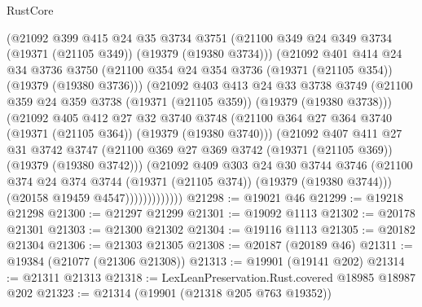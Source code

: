 \begin{lexlean}{RustCore}
\begin{coremodule}
                (@21092
                  @399
                  @415
                  @24
                  @35
                  @3734
                  @3751
                  (@21100 @349 @24 @349 @3734 (@19371 (@21105 @349)) (@19379 (@19380 @3734)))
                  (@21092
                    @401
                    @414
                    @24
                    @34
                    @3736
                    @3750
                    (@21100 @354 @24 @354 @3736 (@19371 (@21105 @354)) (@19379 (@19380 @3736)))
                    (@21092
                      @403
                      @413
                      @24
                      @33
                      @3738
                      @3749
                      (@21100 @359 @24 @359 @3738 (@19371 (@21105 @359)) (@19379 (@19380 @3738)))
                      (@21092
                        @405
                        @412
                        @27
                        @32
                        @3740
                        @3748
                        (@21100 @364 @27 @364 @3740 (@19371 (@21105 @364)) (@19379 (@19380 @3740)))
                        (@21092
                          @407
                          @411
                          @27
                          @31
                          @3742
                          @3747
                          (@21100
                            @369
                            @27
                            @369
                            @3742
                            (@19371 (@21105 @369))
                            (@19379 (@19380 @3742)))
                          (@21092
                            @409
                            @303
                            @24
                            @30
                            @3744
                            @3746
                            (@21100
                              @374
                              @24
                              @374
                              @3744
                              (@19371 (@21105 @374))
                              (@19379 (@19380 @3744)))
                            (@20158 @19459 @4547)))))))))))))
@21298 := @19021 @46
@21299 := @19218 @21298
@21300 := @21297 @21299
@21301 := @19092 @1113
@21302 := @20178 @21301
@21303 := @21300 @21302
@21304 := @19116 @1113
@21305 := @20182 @21304
@21306 := @21303 @21305
@21308 := @20187 (@20189 @46)
@21311 := @19384 (@21077 (@21306 @21308))
@21313 := @19901 (@19141 @202)
@21314 := @21311 @21313
@21318 := LexLeanPreservation.Rust.covered @18985 @18987 @202
@21323 := @21314 (@19901 (@21318 @205 @763 @19352))

\end{coremodule}
\end{lexlean}

